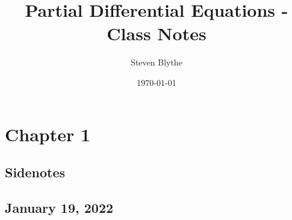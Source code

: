 \documentclass{article}
\title{Partial Differential Equations - Class Notes}
\date{\today}
\author{Steven Blythe}
\begin{document}
\maketitle
\newpage
\section{Chapter 1}
\subsection*{Sidenotes}
\subsection{January 19, 2022}
\end{document}
